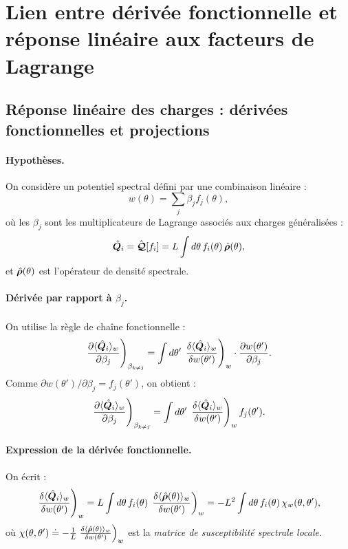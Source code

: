 






\section{Lien entre dérivée fonctionnelle et réponse linéaire aux facteurs de Lagrange}

\subsection{Réponse linéaire des charges : dérivées fonctionnelles et projections} 

\paragraph{Hypothèses.}
On considère un potentiel spectral défini par une combinaison linéaire :
\[
w(\theta) = \sum_j \beta_j f_j(\theta),
\]
où les \( \beta_j \) sont les multiplicateurs de Lagrange associés aux charges généralisées :
\[
\hat{\bm{Q}}_i = \hat{\bm{\mathcal{Q}}}[f_i] = L \int d\theta\, f_i(\theta)\, \hat{\bm{\rho}}(\theta),
\]
et \( \hat{\bm{\rho}}(\theta) \) est l’opérateur de densité spectrale.

\paragraph{Dérivée par rapport à \( \beta_j \).}
On utilise la règle de chaîne fonctionnelle :
\[
\left. \frac{\partial \langle \hat{\bm{Q}}_i \rangle_w }{ \partial \beta_j } \right)_{\beta_{k \ne j}} = \int d\theta'\, \left. \frac{\delta \langle \hat{\bm{Q}}_i \rangle_w }{ \delta w(\theta') } \right)_{w} \cdot \frac{\partial w(\theta')}{\partial \beta_j}.
\]
Comme \( \partial w(\theta') / \partial \beta_j = f_j(\theta') \), on obtient :
\[
\left. \frac{\partial \langle \hat{\bm{Q}}_i \rangle_w }{ \partial \beta_j } \right)_{\beta_{k \ne j}} = \int d\theta'\, \left. \frac{\delta \langle \hat{\bm{Q}}_i \rangle_w }{ \delta w(\theta') } \right)_{w} f_j(\theta').
\]

\paragraph{Expression de la dérivée fonctionnelle.}
On écrit :
\[
\left. \frac{\delta \langle \hat{\bm{Q}}_i \rangle_w }{ \delta w(\theta') } \right)_{w} = L \int d\theta\, f_i(\theta)\, \left. \frac{\delta \langle \hat{\bm{\rho}}(\theta) \rangle_w }{ \delta w(\theta') } \right)_{w} = - L^2 \int d\theta\, f_i(\theta)\, \chi_w(\theta, \theta'),
\]
où \( \chi(\theta, \theta') \doteq  - \frac{1}{L} \left. \frac{\delta \langle \hat{\bm{\rho}}(\theta) \rangle_w }{ \delta w(\theta') } \right)_{w} \) est la {\em matrice de susceptibilité spectrale locale}.

